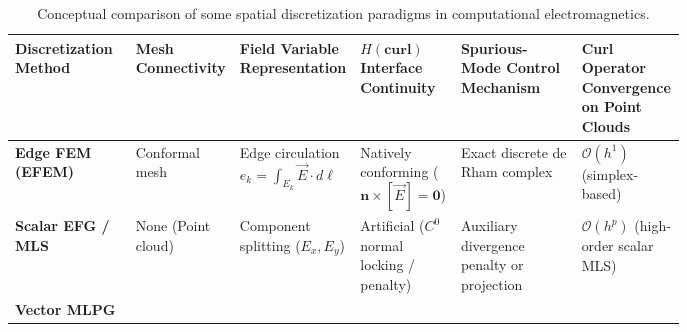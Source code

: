 \documentclass[preprint,12pt]{elsarticle}
\begin{document}
\begin{table}[!htbp]
    \centering
    \footnotesize
    \setlength{\tabcolsep}{3pt}
    \caption{Conceptual comparison of some spatial discretization paradigms in computational electromagnetics.}
    \label{tab:meshless_comparison}
    \begin{tabularx}{\linewidth}{@{}
        >{\raggedright\arraybackslash}p{0.18\linewidth}
        >{\centering\arraybackslash}p{0.12\linewidth}
        >{\centering\arraybackslash}p{0.15\linewidth}
        >{\centering\arraybackslash}p{0.15\linewidth}
        >{\centering\arraybackslash}p{0.18\linewidth}
        >{\centering\arraybackslash}X
        @{}}
        \toprule
        \textbf{Discretization Method}                                                   &
        \textbf{Mesh Connectivity}                                                       &
        \textbf{Field Variable Representation}                                           &
        \textbf{$H(\mathbf{curl})$ Interface Continuity}                                 &
        \textbf{Spurious-Mode Control Mechanism}                                         &
        \textbf{Curl Operator Convergence on Point Clouds}                                 \\
        \midrule
        \textbf{Edge FEM (EFEM)} \cite{nedelec1980mixed, monk2003finite, boffi2013mixed} &
        Conformal mesh                                                                   &
        Edge circulation $e_k = \int_{E_k} \vec{E} \cdot d\boldsymbol{\ell}$             &
        Natively conforming ($\mathbf{n} \times [\vec{E}] = \mathbf{0}$)                 &
        Exact discrete de Rham complex                                                   &
        $\mathcal{O}(h^1)$ (simplex-based)                                                 \\
        \addlinespace
        \textbf{Scalar EFG / MLS} \cite{belytschko1994element, cingoski1998element}      &
        None (Point cloud)                                                               &
        Component splitting ($E_x, E_y$)                                                 &
        Artificial ($C^0$ normal locking / penalty)                                      &
        Auxiliary divergence penalty or projection                                       &
        $\mathcal{O}(h^p)$ (high-order scalar MLS)                                         \\
        \addlinespace
        \textbf{Vector MLPG} \cite{atluri2002meshless, nicomedes2012meshless}            &

\end{tabularx}
\end{table}
\end{document}
